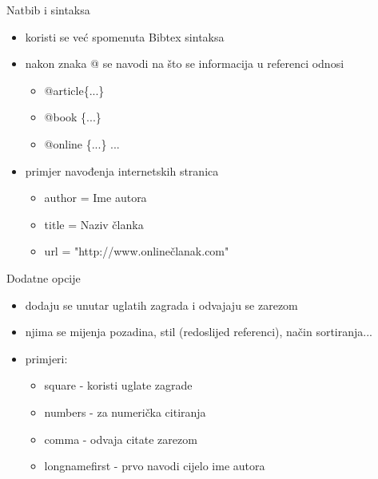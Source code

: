 \documentclass{beamer}
\begin{document}
\begin{frame}{Natbib i sintaksa}
\begin{itemize}
	\item koristi se već spomenuta Bibtex sintaksa \\
	\item nakon znaka @ se navodi na što se informacija u referenci odnosi \\
	\begin{itemize}
		\item @article\{...\} \\
		\item @book \{...\}\\
		\item @online \{...\} ... \\
	\end{itemize}
	\item primjer navođenja internetskih stranica \\
		\begin{itemize}
			\item author = Ime autora \\
			\item title = Naziv članka \\
			\item url = "http://www.onlinečlanak.com" \\
		\end{itemize}
\end{itemize}
\end{frame}

\begin{frame}{Dodatne opcije}
\begin{itemize}
	\item dodaju se unutar uglatih zagrada i odvajaju se zarezom \\
	\item njima se mijenja pozadina, stil (redoslijed referenci), način sortiranja... \\
	\item primjeri:
	\begin{itemize}
			\item square - koristi uglate zagrade \\
			\item numbers - za numerička citiranja \\
			\item comma - odvaja citate zarezom \\
			\item longnamefirst - prvo navodi cijelo ime autora \\
	\end{itemize}
\end{itemize}
\end{frame}
\end{document}
